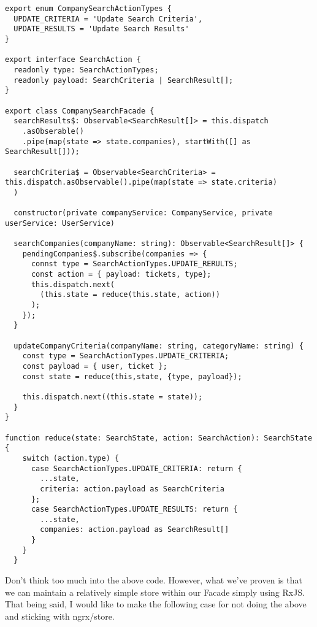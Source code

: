 \begin{lstlisting}[caption=company-search.facade.ts]
export enum CompanySearchActionTypes {
  UPDATE_CRITERIA = 'Update Search Criteria',
  UPDATE_RESULTS = 'Update Search Results'
}

export interface SearchAction {
  readonly type: SearchActionTypes;
  readonly payload: SearchCriteria | SearchResult[];
}

export class CompanySearchFacade {
  searchResults$: Observable<SearchResult[]> = this.dispatch
    .asObserable() 
    .pipe(map(state => state.companies), startWith([] as SearchResult[]));

  searchCriteria$ = Observable<SearchCriteria> = this.dispatch.asObservable().pipe(map(state => state.criteria)
  ) 

  constructor(private companyService: CompanyService, private userService: UserService)
    
  searchCompanies(companyName: string): Observable<SearchResult[]> {
    pendingCompanies$.subscribe(companies => {
      connst type = SearchActionTypes.UPDATE_RERULTS;
      const action = { payload: tickets, type};
      this.dispatch.next(
        (this.state = reduce(this.state, action))
      );
    });
  }

  updateCompanyCriteria(companyName: string, categoryName: string) {
    const type = SearchActionTypes.UPDATE_CRITERIA;
    const payload = { user, ticket };
    const state = reduce(this,state, {type, payload});

    this.dispatch.next((this.state = state));
  }
}  

function reduce(state: SearchState, action: SearchAction): SearchState {
    switch (action.type) {
      case SearchActionTypes.UPDATE_CRITERIA: return {
        ...state,
        criteria: action.payload as SearchCriteria
      };
      case SearchActionTypes.UPDATE_RESULTS: return {
        ...state,
        companies: action.payload as SearchResult[]
      }
    }
  }
\end{lstlisting} 

Don't think too much into the above code. However, what we've proven is that we can maintain a relatively simple store within our Facade simply using RxJS. That being said, I would like to make the following case for not doing the above and sticking with ngrx/store.

